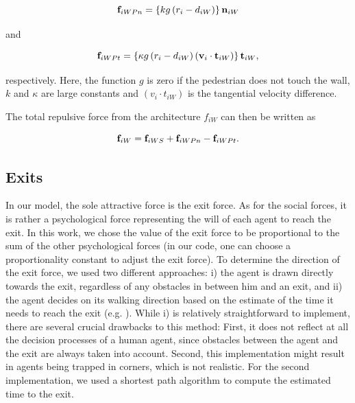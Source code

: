 \documentclass[11pt]{article}
\begin{document}
\begin{equation}
	{{\bf f}_{iWPn}} = \left\{ {kg\left( {{r_i} - {d_{iW}}} \right)} \right\}{{\bf n}_{iW}}
	\label{eq:fiWPn}
\end{equation}

and

\begin{equation}
	{{\bf f}_{iWPt}} = \left\{ {\kappa g\left( {{r_i} - {d_{iW}}} \right)\left( {{{\bf v}_i} \cdot {{\bf t}_{iW}}} \right)} \right\}{{\bf t}_{iW}} ,
	\label{eq:fiWPt}
\end{equation}

respectively. Here, the function $g$ is zero if the pedestrian does not touch the wall, $k$ and $\kappa$ are large constants and $(v_i \cdot t_{iW})$ is the tangential velocity difference.

The total repulsive force from the architecture $f_{iW}$ can then be written as

\begin{equation}
	{{\bf f}_{iW}} = {{\bf f}_{iWS}} + {{\bf f}_{iWPn}} - {{\bf f}_{iWPt}} .
	\label{eq:fiW}
\end{equation}



\subsection{Exits}
\label{sec:Exits1}

In our model, the sole attractive force is the exit force. As for the social forces, it is rather a psychological force representing the will of each agent to reach the exit. In this work, we chose the value of the exit force to be proportional to the sum of the other psychological forces (in our code, one can choose a proportionality constant to adjust the exit force). To determine the direction of the exit force, we used two different approaches: i) the agent is drawn directly towards the exit, regardless of any obstacles in between him and an exit, and ii) the agent decides on its walking direction based on the estimate of the time it needs to reach the exit (e.g. \citet{HeerBuehler}).
While i) is relatively straightforward to implement, there are several crucial drawbacks to this method: First, it does not reflect at all the decision processes of a human agent, since obstacles between the agent and the exit are always taken into account. Second, this implementation might result in agents being trapped in corners, which is not realistic. For the second implementation, we used a shortest path algorithm to compute the estimated time to the exit.
\end{document}
